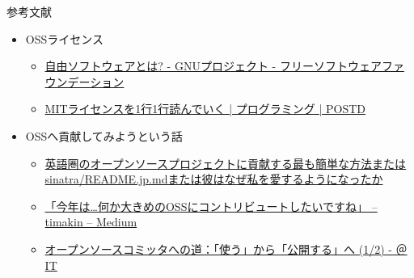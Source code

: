 \documentclass[
        unicode%
    ]{beamer}
\begin{document}
\begin{frame}{参考文献}
    \begin{itemize}
        \item OSSライセンス
            \begin{itemize}
                \item \href{https://www.gnu.org/philosophy/free-sw.ja.html}{自由ソフトウェアとは? - GNUプロジェクト - フリーソフトウェアファウンデーション}
                \item \href{http://postd.cc/mit-license-line-by-line/}{MITライセンスを1行1行読んでいく | プログラミング | POSTD}
            \end{itemize}
        \item OSSへ貢献してみようという話
            \begin{itemize}
                \item \href{https://melborne.github.io/2014/01/23/contribute-to-english-based-opensource-project-or-sinatra-japanese-readme/}{英語圏のオープンソースプロジェクトに貢献する最も簡単な方法またはsinatra/README.jp.mdまたは彼はなぜ私を愛するようになったか}
                \item \href{https://medium.com/@timakin/\%E4\%BB\%8A\%E5\%B9\%B4\%E3\%81\%AF-\%E4\%BD\%95\%E3\%81\%8B\%E5\%A4\%A7\%E3\%81\%8D\%E3\%82\%81\%E3\%81\%AEoss\%E3\%81\%AB\%E3\%82\%B3\%E3\%83\%B3\%E3\%83\%88\%E3\%83\%AA\%E3\%83\%93\%E3\%83\%A5\%E3\%83\%BC\%E3\%83\%88\%E3\%81\%97\%E3\%81\%9F\%E3\%81\%84\%E3\%81\%A7\%E3\%81\%99\%E3\%81\%AD-902771f0ba0e}{「今年は…何か大きめのOSSにコントリビュートしたいですね」 – timakin – Medium}
                \item \href{http://www.atmarkit.co.jp/ait/articles/1211/28/news006.html}{オープンソースコミッタへの道：「使う」から「公開する」へ (1/2) - ＠IT}
            \end{itemize}
    \end{itemize}
\end{frame}
\end{document}
